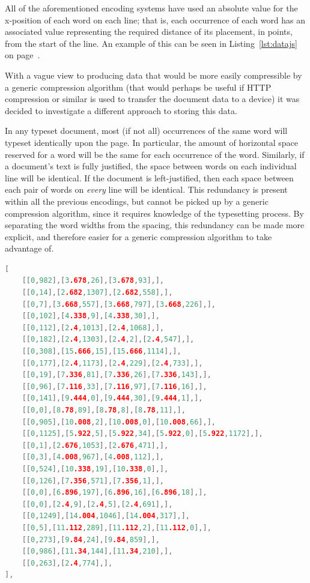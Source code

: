 All of the aforementioned encoding systems have used an absolute value for the x-position of each word on each line; that is, each occurrence of each word has an associated value representing the required distance of its placement, in \glspl{point}, from the start of the line. An example of this can be seen in Listing~\ref{lst:datajs} on page~\pageref{lst:datajs}.

With a vague view to producing data that would be more easily compressible by a generic compression algorithm (that would perhaps be useful if HTTP compression or similar is used to transfer the document data to a device) it was decided to investigate a different approach to storing this data.

In any typeset document, most (if not all) occurrences of the same word will typeset identically upon the page. In particular, the amount of horizontal space reserved for a word will be the same for each occurrence of the word. Similarly, if a document's text is fully justified, the space between words on each individual line will be identical. If the document is left-justified, then each space between each pair of words on \emph{every} line will be identical. This redundancy is present within all the previous encodings, but cannot be picked up by a generic compression algorithm, since it requires knowledge of the typesetting process. By separating the word widths from the spacing, this redundancy can be made more explicit, and therefore easier for a generic compression algorithm to take advantage of.

\begin{lstlisting}[label=lst:deltasdata,captionpos=b,float,language=c,stringstyle=\color{blue},basicstyle=\ttfamily\footnotesize,caption={[Excerpt from a paragraph tree using deltas]Excerpt from a JavaScript data file that uses position deltas in the Galley Structure Tree, representing one galley rendering of one paragraph. The first value in each pair is the position delta, and the second is the dictionary key of the relevant word.}]
[
    [[0,982],[3.678,26],[3.678,93],],
    [[0,14],[2.682,1307],[2.682,558],],
    [[0,7],[3.668,557],[3.668,797],[3.668,226],],
    [[0,102],[4.338,9],[4.338,30],],
    [[0,112],[2.4,1013],[2.4,1068],],
    [[0,182],[2.4,1303],[2.4,2],[2.4,547],],
    [[0,308],[15.666,15],[15.666,1114],],
    [[0,177],[2.4,1173],[2.4,229],[2.4,733],],
    [[0,19],[7.336,81],[7.336,26],[7.336,143],],
    [[0,96],[7.116,33],[7.116,97],[7.116,16],],
    [[0,141],[9.444,0],[9.444,30],[9.444,1],],
    [[0,0],[8.78,89],[8.78,8],[8.78,11],],
    [[0,905],[10.008,2],[10.008,0],[10.008,66],],
    [[0,1125],[5.922,5],[5.922,34],[5.922,0],[5.922,1172],],
    [[0,1],[2.676,1053],[2.676,471],],
    [[0,3],[4.008,967],[4.008,112],],
    [[0,524],[10.338,19],[10.338,0],],
    [[0,126],[7.356,571],[7.356,1],],
    [[0,0],[6.896,197],[6.896,16],[6.896,18],],
    [[0,0],[2.4,9],[2.4,5],[2.4,691],],
    [[0,1249],[14.004,1046],[14.004,317],],
    [[0,5],[11.112,289],[11.112,2],[11.112,0],],
    [[0,273],[9.84,24],[9.84,859],],
    [[0,986],[11.34,144],[11.34,210],],
    [[0,263],[2.4,774],],
],
\end{lstlisting}

